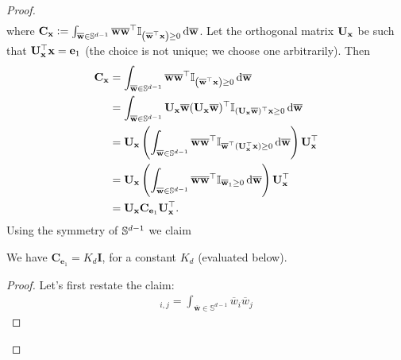 \begin{proof}
\begin{align}
	\end{align}
	\endgroup
	where $\mathbf{C}_{\mathbf{x}} :=  \int_{\overline{\mathbf{w}} \in \mathbb{S}^{d-1}} \overline{\mathbf{w}} \overline{\mathbf{w}}^{\top} \mathbb{I}_{\left(\overline{\mathbf{w}}^{\top} \mathbf{x} \right) \ge 0}  \,\mathrm{d} \overline{\mathbf{w}}$.
	Let the orthogonal matrix $\mathbf{U}_{\mathbf{x}}$ be such that $\mathbf{U}_{\mathbf{x}}^\top \mathbf{x} = \mathbf{e}_1$ (the choice is not unique; we choose one arbitrarily).
	Then 
	\begin{align}
		\mathbf{C}_{\mathbf{x}} 
		&=  \int_{\overline{\mathbf{w}} \in \mathbb{S}^{d-1}} \overline{\mathbf{w}} \overline{\mathbf{w}}^{\top} \mathbb{I}_{\left(\overline{\mathbf{w}}^{\top} \mathbf{x} \right) \ge 0}  \,\mathrm{d} \overline{\mathbf{w}} \nonumber
		\\&= \int_{\overline{\mathbf{w}} \in \mathbb{S}^{d-1}} \mathbf{U}_{\mathbf{x}} \overline{\mathbf{w}} (\mathbf{U}_{\mathbf{x}}\overline{\mathbf{w}})^\top \mathbb{I}_{(\mathbf{U}_{\mathbf{x}} \overline{\mathbf{w}})^{\top} \mathbf{x}  \ge 0} \,\mathrm{d} \overline{\mathbf{w}} \nonumber
		\\&= \mathbf{U}_{\mathbf{x}} \left( \int_{\overline{\mathbf{w}} \in \mathbb{S}^{d-1}} \overline{\mathbf{w}} \overline{\mathbf{w}}^\top \mathbb{I}_{\overline{\mathbf{w}}^{\top} (\mathbf{U}_{\mathbf{x}}^\top \mathbf{x}) \ge 0}  \,\mathrm{d} \overline{\mathbf{w}} \right) \mathbf{U}_{\mathbf{x}}^\top \nonumber
		\\&= \mathbf{U}_{\mathbf{x}} \left( \int_{\overline{\mathbf{w}} \in \mathbb{S}^{d-1}} \overline{\mathbf{w}} \overline{\mathbf{w}}^\top 
		\mathbb{I}_{\overline{\mathbf{w}}_1 \ge 0}  \,\mathrm{d} \overline{\mathbf{w}} \right) \mathbf{U}_{\mathbf{x}}^\top \nonumber
		\\&= \mathbf{U}_{\mathbf{x}} \mathbf{C}_{\mathbf{e}_1} \mathbf{U}_{\mathbf{x}}^\top.  \label{eqn:Cx}
	\end{align}
	Using the symmetry of $\mathbb{S}^{d-1}$ we claim
	\begin{claim}\label{claim:Kd}
		We have $\mathbf{C}_{\mathbf{e}_1} = K_d \mathbf{I}$, for a constant $K_d$ (evaluated below). 
	\end{claim}
	\begin{proof}
		Let's first restate the claim:      
		\begin{align*}
			[\mathbf{C}_{\mathbf{e}_1}]_{i,j} = \int_{\overline{\mathbf{w}} \in \mathbb{S}^{d-1}} \overline{w}_i \overline{w}_j

\end{align*}
\end{proof}
\end{proof}
